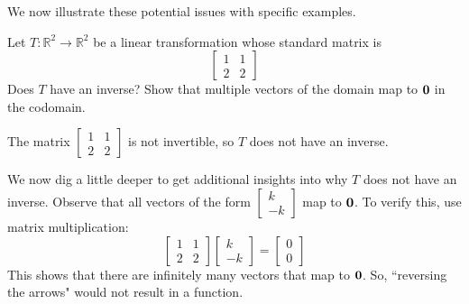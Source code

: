 \documentclass{ximera}
\renewcommand{\vec}[1]{{\bf #1}}
\newcommand{\RR}{\mathbb{R}}
\begin{document}
We now illustrate these potential issues with specific examples.
\begin{example}\label{ex:notonetoone} Let $T:\RR^2\rightarrow \RR^2$ be a linear transformation whose standard matrix is
$$\begin{bmatrix}1&1\\2&2\end{bmatrix}$$
Does $T$ have an inverse? Show that multiple vectors of the domain map to $\vec{0}$ in the codomain.  

\begin{explanation} The matrix $\begin{bmatrix}1&1\\2&2\end{bmatrix}$ is not invertible, so $T$ does not have an inverse.

We now dig a little deeper to get additional insights into why $T$ does not have an inverse.  Observe that all vectors of the form $\begin{bmatrix}k\\-k\end{bmatrix}$ map to $\vec{0}$.  To verify this, use matrix multiplication:
$$\begin{bmatrix}1&1\\2&2\end{bmatrix}\begin{bmatrix}k\\-k\end{bmatrix}=\begin{bmatrix}0\\0\end{bmatrix}$$
This shows that there are infinitely many vectors that map to $\vec{0}$.  So, ``reversing the arrows" would not result in a function.


\end{explanation}
\end{example}
\end{document}
